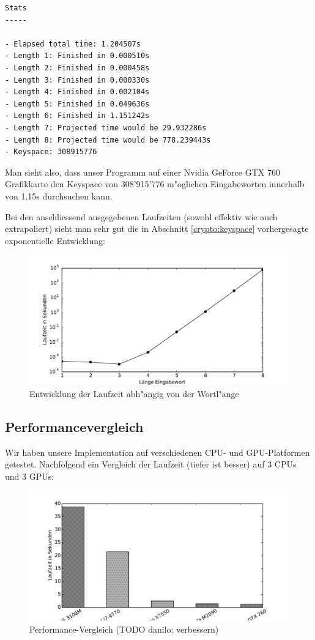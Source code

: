 \begin{refsection}
\begin{small}
\begin{verbatim}
Stats
-----

- Elapsed total time: 1.204507s
- Length 1: Finished in 0.000510s
- Length 2: Finished in 0.000458s
- Length 3: Finished in 0.000330s
- Length 4: Finished in 0.002104s
- Length 5: Finished in 0.049636s
- Length 6: Finished in 1.151242s
- Length 7: Projected time would be 29.932286s
- Length 8: Projected time would be 778.239443s
- Keyspace: 308915776
\end{verbatim}
\end{small}

Man sieht also, dass unser Programm auf einer Nvidia GeForce GTX 760 Grafikkarte
den Keyspace von 308'915'776 m"oglichen Eingabeworten innerhalb von 1.15s
durchsuchen kann.

Bei den anschliessend ausgegebenen Laufzeiten (sowohl effektiv wie auch
extrapoliert) sieht man sehr gut die in Abschnitt \ref{crypto:keyspace}
vorhergesagte exponentielle Entwicklung:

\begin{figure}[H]
	\centering
	\includegraphics[width=.9\textwidth]{crypto/graphs/runtime.pdf}
	\caption{Entwicklung der Laufzeit abh"angig von der Wortl"ange}
	\label{img:crypto:triplets}
\end{figure}

\subsection{Performancevergleich}

Wir haben unsere Implementation auf verschiedenen CPU- und GPU-Platformen
getestet. Nachfolgend ein Vergleich der Laufzeit (tiefer ist besser) auf 3 CPUs
und 3 GPUs:

\begin{figure}[H]
	\centering
	\includegraphics[width=.9\textwidth]{crypto/graphs/speed_comparison_v1.pdf}
	\caption{Performance-Vergleich (TODO danilo: verbessern)}
	\label{img:crypto:speed_comparison_v1}
\end{figure}


\end{refsection}
